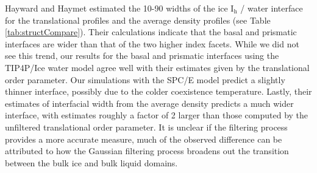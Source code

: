 Hayward and Haymet estimated the 10-90 widths of the ice
I$_\mathrm{h}$ / water interface for the translational profiles and
the average density profiles (see Table
\ref{tab:structCompare}). Their calculations indicate that the basal
and prismatic interfaces are wider than that of the two higher index
facets. While we did not see this trend, our results for the basal and
prismatic interfaces using the TIP4P/Ice water model agree well with
their estimates given by the translational order parameter. Our
simulations with the SPC/E model predict a slightly thinner interface,
possibly due to the colder coexistence temperature. Lastly, their
estimates of interfacial width from the average density predicts a
much wider interface, with estimates roughly a factor of 2 larger than
those computed by the unfiltered translational order parameter. It is
unclear if the filtering process provides a more accurate measure,
much of the observed difference can be attributed to how the Gaussian
filtering process broadens out the transition between the bulk ice and
bulk liquid domains.



